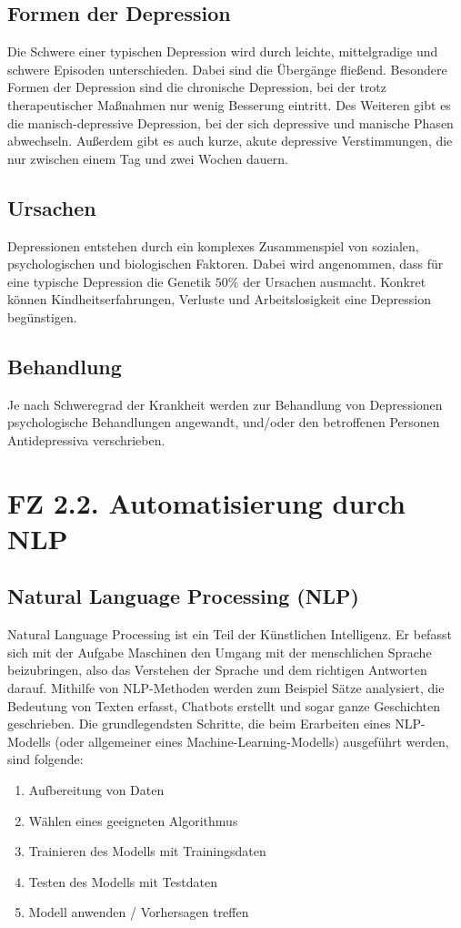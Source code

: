 \subsection{Formen der Depression}
Die Schwere einer typischen Depression wird durch leichte, mittelgradige und schwere Episoden unterschieden. Dabei 
sind die Übergänge fließend.
Besondere Formen der Depression sind die chronische Depression, bei der trotz therapeutischer Maßnahmen nur wenig 
Besserung eintritt. Des Weiteren gibt es die manisch-depressive Depression, bei der sich depressive und manische 
Phasen abwechseln. Außerdem gibt es auch kurze, akute depressive Verstimmungen, die nur zwischen einem Tag und
zwei Wochen dauern. 

\subsection{Ursachen}
Depressionen entstehen durch ein komplexes Zusammenspiel von sozialen, psychologischen und biologischen Faktoren.
Dabei wird angenommen, dass für eine typische Depression die Genetik $50 \%$ der Ursachen ausmacht. 
Konkret können Kindheitserfahrungen, Verluste und Arbeitslosigkeit eine Depression begünstigen.

\subsection{Behandlung}
Je nach Schweregrad der Krankheit werden zur Behandlung von Depressionen psychologische Behandlungen angewandt, 
und/oder den betroffenen Personen Antidepressiva verschrieben.


%
%
\section{FZ 2.2. Automatisierung durch NLP}
\label{sec:fz2.2.} 

\subsection{Natural Language Processing (NLP)}
Natural Language Processing ist ein Teil der Künstlichen Intelligenz. Er befasst sich mit der Aufgabe
Maschinen den Umgang mit der menschlichen Sprache beizubringen, also das Verstehen der Sprache und dem
richtigen Antworten darauf. Mithilfe von NLP-Methoden werden zum Beispiel Sätze analysiert, die Bedeutung 
von Texten erfasst, Chatbots erstellt und sogar ganze Geschichten geschrieben.
Die grundlegendsten Schritte, die beim Erarbeiten eines NLP-Modells (oder allgemeiner eines 
Machine-Learning-Modells) ausgeführt werden, sind folgende:
\begin{enumerate}
	\item Aufbereitung von Daten
	\item Wählen eines geeigneten Algorithmus
	\item Trainieren des Modells mit Trainingsdaten
	\item Testen des Modells mit Testdaten
	\item Modell anwenden / Vorhersagen treffen
\end{enumerate}

